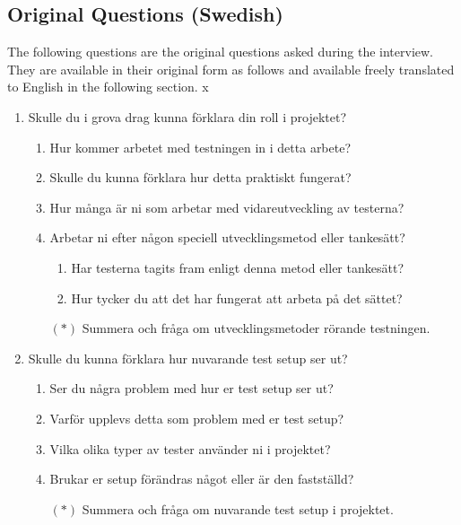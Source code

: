 \vspace{1ex}
\tocless\subsection{Original Questions (Swedish)}
The following questions are the original questions asked during the interview. They are available in their original form as follows and available freely translated to English in the following section.
x
\vspace{1ex}
\begin{otherlanguage}{swedish}
\begin{enumerate}
  \item\label{itm:int:role} Skulle du i grova drag kunna förklara din roll i projektet?
  \begin{enumerate}
    \item\label{itm:int:role:a} Hur kommer arbetet med testningen in i detta arbete?
    \item\label{itm:int:role:b} Skulle du kunna förklara hur detta praktiskt fungerat?
    \item\label{itm:int:role:c} Hur många är ni som arbetar med vidareutveckling av testerna?
    \item\label{itm:int:role:d} Arbetar ni efter någon speciell utvecklingsmetod eller tankesätt?
    \begin{enumerate}
      \item\label{itm:int:role:d:i} Har testerna tagits fram enligt denna metod eller tankesätt?
      \item\label{itm:int:role:d:ii} Hur tycker du att det har fungerat att arbeta på det sättet?
    \end{enumerate}
    \item[$(*)$] Summera och fråga om utvecklingsmetoder rörande testningen.
  \end{enumerate}
  
  \item\label{itm:int:setup} Skulle du kunna förklara hur nuvarande test setup ser ut?
  \begin{enumerate}
    \item\label{itm:int:setup:a} Ser du några problem med hur er test setup ser ut?
    \item\label{itm:int:setup:b} Varför upplevs detta som problem med er test setup?
    \item\label{itm:int:setup:c} Vilka olika typer av tester använder ni i projektet?
    \item\label{itm:int:setup:d} Brukar er setup förändras något eller är den fastställd?
    \item[$(*)$] Summera och fråga om nuvarande test setup i projektet.
  \end{enumerate}
  

\end{enumerate}
\end{otherlanguage}
